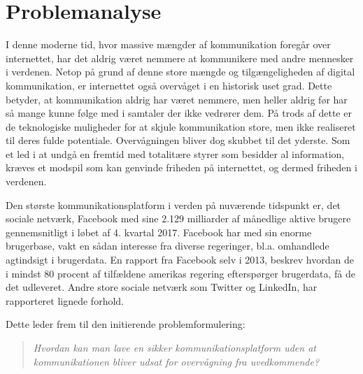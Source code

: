 \section{Problemanalyse}
I denne moderne tid, hvor massive mængder af kommunikation foregår over internettet, har det aldrig været nemmere at kommunikere med andre mennesker i verdenen. Netop på grund af denne store mængde og tilgængeligheden af digital kommunikation, er internettet også overvåget i en historisk uset grad. Dette betyder, at kommunikation aldrig har været nemmere, men heller aldrig før har så mange kunne følge med i samtaler der ikke vedrører dem.\cite{Adgang_PersonligeData} På trods af dette er de teknologiske muligheder for at skjule kommunikation store, men ikke realiseret til deres fulde potentiale. Overvågningen bliver dog skubbet til det yderste. Som et led i at undgå en fremtid med totalitære styrer som besidder al information, kræves et modspil som kan genvinde friheden på internettet, og dermed friheden i verdenen. 

Den største kommunikationsplatform i verden på nuværende tidspunkt er, det sociale netværk, Facebook med sine 2.129 milliarder af månedlige aktive brugere gennemsnitligt i løbet af 4. kvartal 2017.\cite{FacebookStat} Facebook har med sin enorme brugerbase, vakt en sådan interesse fra diverse regeringer, bl.a. omhandlede agtindsigt i brugerdata. En rapport fra Facebook selv i 2013, beskrev hvordan de i mindst 80 procent af tilfældene amerikas regering efterspørger brugerdata, få de det udleveret.\cite{PolitikenFacebook} Andre store sociale netværk som Twitter og LinkedIn, har rapporteret lignede forhold.\cite{PolitikenFacebook}

Dette leder frem til den initierende problemformulering:
\begin{quote}
    \textit{Hvordan kan man lave en sikker kommunikationsplatform uden at kommunikationen bliver udsat for overvågning fra uvedkommende?}
\end{quote}

\newpage
%

\newpage

\newpage

\newpage